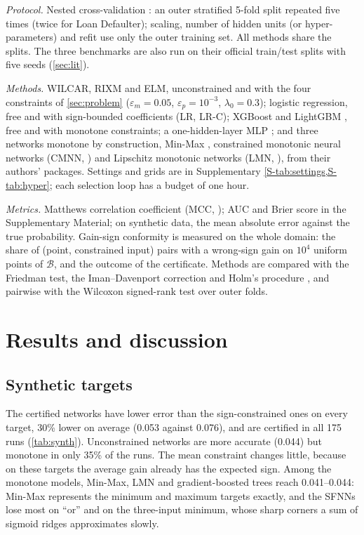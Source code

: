 \documentclass[preprint,12pt,authoryear]{elsarticle}
\newcommand{\B}{\mathcal{B}}
\begin{document}

\emph{Protocol.} Nested cross-validation \citep{VarmaSimon2006,CawleyTalbot2010}: an outer stratified 5-fold split
repeated five times (twice for Loan Defaulter); scaling, number of hidden units (or hyper-parameters) and refit use
only the outer training set. All methods share the splits. The three benchmarks are also run on their official
train/test splits with five seeds (\cref{sec:lit}).

\emph{Methods.} WILCAR, RIXM and ELM, unconstrained and with the four constraints of \cref{sec:problem}
($\varepsilon_m=0.05$, $\varepsilon_p=10^{-3}$, $\lambda_0=0.3$); logistic regression, free and with sign-bounded
coefficients (LR, LR-C); XGBoost \citep{ChenGuestrin2016} and LightGBM \citep{Ke2017}, free and with monotone
constraints; a one-hidden-layer MLP \citep{Pedregosa2011}; and three networks monotone by construction, Min-Max
\citep{Sill1997}, constrained monotonic neural networks (CMNN, \citealp{Runje2023}) and Lipschitz monotonic networks
(LMN, \citealp{Nolte2023}), from their authors' packages. Settings and grids are in Supplementary
\cref{S-tab:settings,S-tab:hyper}; each selection loop has a budget of one hour.

\emph{Metrics.} Matthews correlation coefficient (MCC, \citealp{ChiccoJurman2020}); AUC and Brier score in the
Supplementary Material; on synthetic data, the mean absolute error against the true probability. Gain-sign conformity is
measured on the whole domain: the share of (point, constrained input) pairs with a wrong-sign gain on $10^4$ uniform
points of $\B$, and the outcome of the certificate. Methods are compared with the Friedman test, the Iman--Davenport
correction and Holm's procedure \citep{Demsar2006}, and pairwise with the Wilcoxon signed-rank test over outer folds.

\section{Results and discussion}\label{sec:results}

\subsection{Synthetic targets}\label{sec:synth}
The certified networks have lower error than the sign-constrained ones on every target, 30\% lower on average (0.053
against 0.076), and are certified in all 175 runs (\cref{tab:synth}). Unconstrained networks are more accurate (0.044)
but monotone in only 35\% of the runs. The mean constraint changes little, because on these targets the average gain
already has the expected sign. Among the monotone models, Min-Max, LMN and gradient-boosted trees reach 0.041--0.044:
Min-Max represents the minimum and maximum targets exactly, and the SFNNs lose most on ``or'' and on the three-input
minimum, whose sharp corners a sum of sigmoid ridges approximates slowly.
\end{document}
